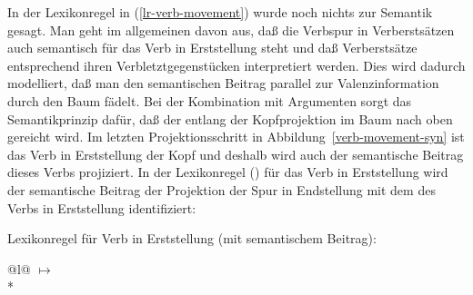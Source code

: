 In der Lexikonregel in (\ref{lr-verb-movement}) wurde noch nichts zur Semantik gesagt. Man geht im allgemeinen davon aus, daß
die Verbspur in Verberstsätzen auch semantisch für das Verb in Erststellung steht und
daß Verberstsätze entsprechend ihren Verbletztgegenstücken interpretiert werden. Dies
wird dadurch modelliert, daß man den semantischen Beitrag parallel zur Valenzinformation
durch den Baum fädelt. 
Bei der Kombination mit Argumenten sorgt das Semantikprinzip dafür, 
daß der \contw entlang der Kopfprojektion im Baum nach
oben gereicht wird. Im letzten Projektionsschritt in Abbildung~\ref{verb-movement-syn}
ist das Verb in Erststellung der Kopf und deshalb wird auch der semantische Beitrag
dieses Verbs projiziert. In der Lexikonregel () für das Verb in Erststellung wird
der semantische Beitrag der Projektion der Spur in Endstellung  mit
dem \contw des Verbs in Erststellung identifiziert:

\eas
\label{lr-verb-movement2}
Lexikonregel für Verb in Erststellung (mit semantischem Beitrag):\\
\begin{tabular}[t]{@{}l@{}}
 $\mapsto$\\*
\end{tabular}
\zs

